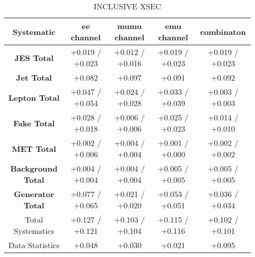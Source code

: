\begin{table}[htbp]
\scriptsize
  \begin{center} 
  \begin{tabular}{|c|c|c|c|c|}
  \hline
 Systematic                            &  ee channel&  mumu channel&  emu channel&  combinaton\\
 \hline
\textbf{JES Total}                    &+0.019   / +0.023   & +0.012   / +0.016   & +0.019   / +0.023   & +0.019   / +0.023  \\
\textbf{Jet Total}                    &+0.082              & +0.097              & +0.091              & +0.092             \\
\textbf{Lepton Total}                 &+0.047   / +0.054   & +0.024   / +0.028   & +0.033   / +0.039   & +0.003   / +0.003  \\
\textbf{Fake Total}                   &+0.028   / +0.018   & +0.006   / +0.006   & +0.025   / +0.023   & +0.014   / +0.010  \\
\textbf{MET Total}                    &+0.002   / +0.006   & +0.004   / +0.004   & +0.001   / +0.000   & +0.002   / +0.002  \\
\textbf{Background Total}             &+0.004   / +0.004   & +0.004   / +0.004   & +0.005   / +0.005   & +0.005   / +0.005  \\
\textbf{Generator Total}              &+0.077   / +0.065   & +0.021   / +0.020   & +0.053   / +0.051   & +0.036   / +0.034  \\
  \hline
  \hline
Total Systematics                     &+0.127   / +0.121   & +0.103   / +0.104   & +0.115   / +0.116   & +0.102   / +0.101  \\
Data Statistics                       &+0.048              & +0.030              & +0.021              & +0.095             \\
  \hline
  \end{tabular}
  \end{center} 
  \label{tab:xsec_nominal_coscos_op}
  \caption{\coscosop INCLUSIVE XSEC}
\end{table}



